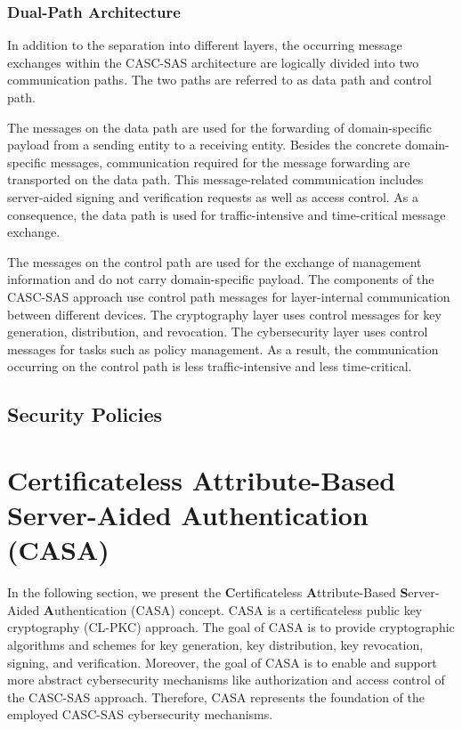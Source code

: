 \subsubsection{Dual-Path Architecture}
\label{sec:approach:casc:architecture:paths}
In addition to the separation into different layers, the occurring message exchanges within the CASC-SAS architecture are logically divided into two communication paths.
The two paths are referred to as data path and control path.

The messages on the data path are used for the forwarding of domain-specific payload from a sending entity to a receiving entity.
Besides the concrete domain-specific messages, communication required for the message forwarding are transported on the data path.
This message-related communication includes server-aided signing and verification requests as well as access control.
As a consequence, the data path is used for traffic-intensive and time-critical message exchange.

The messages on the control path are used for the exchange of management information and do not carry domain-specific payload.
The components of the CASC-SAS approach use control path messages for layer-internal communication between different devices.
The cryptography layer uses control messages for key generation, distribution, and revocation.
The cybersecurity layer uses control messages for tasks such as policy management.
As a result, the communication occurring on the control path is less traffic-intensive and less time-critical.


\subsection{Security Policies}

\section{Certificateless Attribute-Based Server-Aided Authentication (CASA)}
\label{sec:approach:casa}
In the following section, we present the \textbf{C}ertificateless \textbf{A}ttribute-Based \textbf{S}erver-Aided \textbf{A}uthentication (CASA) concept.
CASA is a certificateless public key cryptography (CL-PKC) approach.
The goal of CASA is to provide cryptographic algorithms and schemes for key generation, key distribution, key revocation, signing, and verification.
Moreover, the goal of CASA is to enable and support more abstract cybersecurity mechanisms like authorization and access control of the CASC-SAS approach.
Therefore, CASA represents the foundation of the employed CASC-SAS cybersecurity mechanisms.

